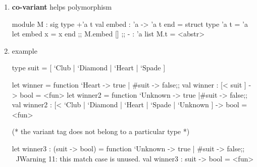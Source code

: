 \begin{enumerate}[(a)]
\begin{enumerate}
  \item \textbf{co-variant} helps polymorphism

\begin{alternate}
module M : sig
    type +'a t
    val embed : 'a -> 'a t
  end = struct
    type 'a t = 'a
    let embed x = x
end ;;
M.embed []  ;;
- : 'a list M.t = <abstr>
\end{alternate}


  \item example

\begin{alternate}
type suit = [ `Club | `Diamond | `Heart | `Spade ]
  
let winner = function `Heart -> true | #suit -> false;;
val winner : [< suit ] -> bool = <fun>
let winner2 = function `Unknown -> true |#suit -> false;;
val winner2 : [< `Club | `Diamond | `Heart | `Spade | `Unknown ] -> bool =
  <fun>

(* the variant tag does not belong to a particular type *)

let winner3 : (suit -> bool) = function `Unknown -> true | #suit -> false;;
                                          ^^^^^^^^
Warning 11: this match case is unused.
val winner3 : suit -> bool = <fun>

\end{alternate}

\end{enumerate}

\end{enumerate}



